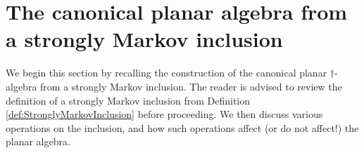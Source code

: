 \documentclass[11pt]{article}
\theoremstyle{plain}
\theoremstyle{definition}
\begin{document}
\section{The canonical planar algebra from a strongly Markov inclusion} 

We begin this section by recalling the construction of the canonical planar $\dag$-algebra from a strongly Markov inclusion.
The reader is advised to review the definition of a strongly Markov inclusion from Definition \ref{def:StronglyMarkovInclusion} before proceeding.
We then discuss various operations on the inclusion, and how such operations affect (or do not affect!) the planar algebra.
\end{document}
